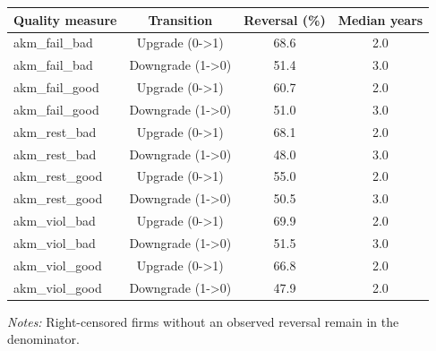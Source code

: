 \documentclass[10pt]{article}
\begin{document}
\begin{minipage}{19cm}\fontsize{10}{12}\selectfont\setlength{\tabcolsep}{4pt}\renewcommand{\arraystretch}{1.12}


\centering
{}
\begin{threeparttable}
\begin{tabular}{p{}ccc}
\toprule
Quality measure & Transition & Reversal (\%) & Median years \\
\midrule
akm\_fail\_bad & Upgrade (0->1) & 68.6 & 2.0 \\
akm\_fail\_bad & Downgrade (1->0) & 51.4 & 3.0 \\
akm\_fail\_good & Upgrade (0->1) & 60.7 & 2.0 \\
akm\_fail\_good & Downgrade (1->0) & 51.0 & 3.0 \\
akm\_rest\_bad & Upgrade (0->1) & 68.1 & 2.0 \\
akm\_rest\_bad & Downgrade (1->0) & 48.0 & 3.0 \\
akm\_rest\_good & Upgrade (0->1) & 55.0 & 2.0 \\
akm\_rest\_good & Downgrade (1->0) & 50.5 & 3.0 \\
akm\_viol\_bad & Upgrade (0->1) & 69.9 & 2.0 \\
akm\_viol\_bad & Downgrade (1->0) & 51.5 & 3.0 \\
akm\_viol\_good & Upgrade (0->1) & 66.8 & 2.0 \\
akm\_viol\_good & Downgrade (1->0) & 47.9 & 2.0 \\
\bottomrule
\end{tabular}
\begin{tablenotes}\fontsize{9}{11}\selectfont
\item \raggedright \fontsize{9}{11}\selectfont \textit{Notes:} Right-censored firms without an observed reversal remain in the denominator.
\end{tablenotes}
\end{threeparttable}

\end{minipage}
\end{document}
